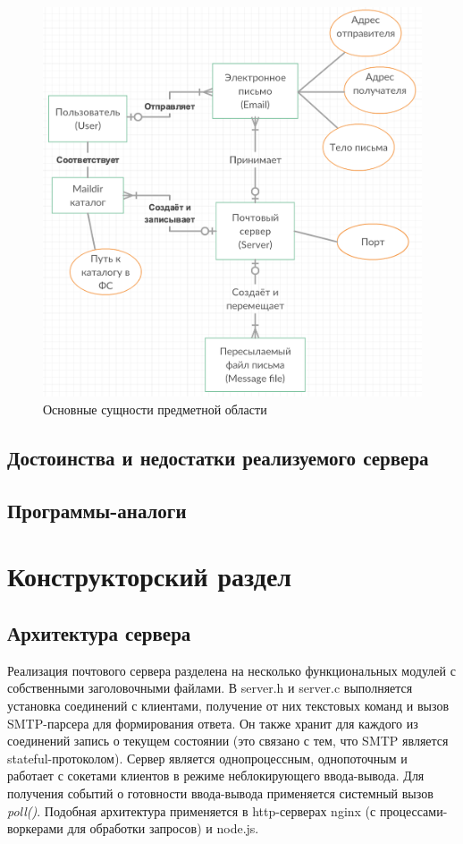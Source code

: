 \documentclass[a4paper,12pt]{report}
\begin{document}
\begin{figure}
\centering
\includegraphics[width=\textwidth]{diagramms/entities.png}
\caption{Основные сущности предметной области}
\label{fig:entities}
\end{figure}

\section{Достоинства и недостатки реализуемого сервера}

\section{Программы-аналоги}


\chapter{Конструкторский раздел}

\section{Архитектура сервера}

Реализация почтового сервера разделена на несколько функциональных модулей с собственными заголовочными файлами. В server.h и server.c выполняется установка соединений с клиентами, получение от них текстовых команд и вызов SMTP-парсера для формирования ответа. Он также хранит для каждого из соединений запись о текущем состоянии (это связано с тем, что SMTP является stateful-протоколом). Сервер является однопроцессным, однопоточным и работает с сокетами клиентов в режиме неблокирующего ввода-вывода. Для получения событий о готовности ввода-вывода применяется системный вызов \textit{poll()}. Подобная архитектура применяется в http-серверах nginx (с процессами-воркерами для обработки запросов) и node.js.
\end{document}
